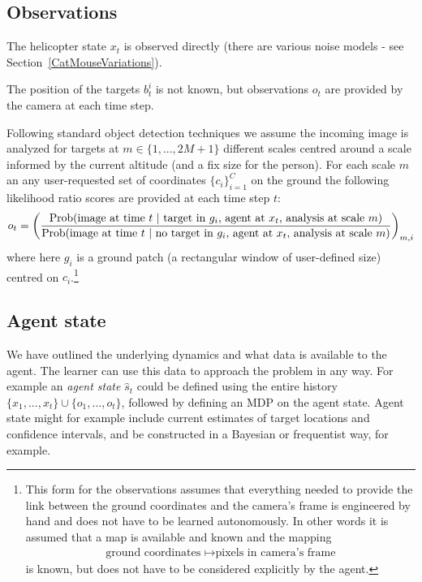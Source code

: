 \documentclass[a4paper,11pt]{report}
\newcommand{\nn}{\nonumber}
\newcommand{\Prob}{{\rm Prob}}
\begin{document}
\subsection{Observations}

The helicopter state $x_t$ is observed directly (there are various noise models - see Section~\ref{CatMouseVariations}).

The position of the targets $b^i_t$ is not known, but observations $o_t$ are provided by the camera at each time step.

Following standard object detection techniques we assume the incoming image is analyzed for targets at $m\in \{1,...,2M + 1\}$ different scales centred around a scale informed by the current altitude (and a fix size for the person). For each scale $m$ an any user-requested set of coordinates $\{c_i\}_{i=1}^C$ on the ground the following likelihood ratio scores are provided at each time step $t$:
\begin{align}
o_{t} = \left(\frac{\Prob(\mbox{image at time } t~|~\mbox{target in $g_{i}$, agent at $x_t$, analysis at scale $m$})}{\Prob(\mbox{image at time }
t~|~\mbox{no target in $g_{i}$, agent at $x_t$, analysis at scale $m$})}\right)_{m,i} \nn
\end{align}
where here $g_{i}$ is a ground patch (a rectangular window of user-defined size) centred on $c_i$.\footnote{This form for the observations assumes that everything needed to provide the link between the ground coordinates and the camera's frame is engineered by hand and does not have to be learned autonomously. In other words it is assumed that a map is available and known and the mapping
\begin{align}
\mbox{ground coordinates } \mapsto \mbox{pixels in camera's frame}\nn
\end{align}
is known, but does not have to be considered explicitly by the agent.}


\subsection{Agent state}

We have outlined the underlying dynamics and what data is available to the agent. The learner can use this data to approach the problem in any way. For example an \emph{agent state} $\hat s_t$ could be defined using the entire history $\{x_1,...,x_t\}\cup\{o_1,...,o_t\}$, followed by defining an MDP on the agent state. Agent state might for example include current estimates of target locations and confidence intervals, and be constructed in a Bayesian or frequentist way, for example.
\end{document}
